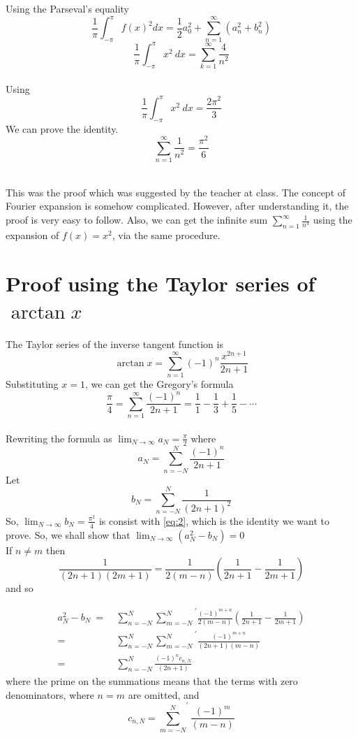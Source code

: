 Using the Parseval's equality
\[
    \frac{1}{\pi}\int_{-\pi}^{\pi}f(x)^2dx = \frac{1}{2}a_{0}^2+\sum_{n=1}^{\infty}(a_n^2+b_n^2)
\]
\[
    \frac{1}{\pi}\int_{-\pi}^{\pi}x^2~dx=\sum_{k=1}^\infty\frac{4}{n^2}
\]~\\


Using 
\[
    \frac{1}{\pi}\int_{-\pi}^{\pi}x^2~dx = \frac{2\pi^2}{3}
\]
We can prove the identity.
\[
    \sum_{n=1}^\infty\frac{1}{n^2}=\frac{\pi^2}{6}
\]~\\
\begin{remark}
    This was the proof which was suggested by the teacher at class. The concept of Fourier expansion is somehow complicated. However, after understanding it, the proof is very easy to follow. Also, we can get the infinite sum $\sum_{n=1}^\infty\frac{1}{n^4}$ using the expansion of $f(x)=x^2$, via the same procedure.
\end{remark}

\newpage
\section{Proof using the Taylor series of $\arctan x$~}
The Taylor series of the inverse tangent function is
\[
    \arctan x = \sum_{n=1}^\infty(-1)^n\frac{x^{2n+1}}{2n+1}
\]
Substituting $x = 1$, we can get the Gregory's formula
\[
    \frac{\pi}{4}=\sum_{n=1}^\infty\frac{(-1)^n}{2n+1} = \frac{1}{1} - \frac{1}{3} + \frac{1}{5} - \cdots
\]
~\\

Rewriting the formula as $\lim_{N\rightarrow\infty}a_N=\frac{\pi}{2}$ where
\[
    a_N = \sum_{n=-N}^{N}\frac{(-1)^n}{2n+1}
\]
Let
\[
    b_N = \sum_{n=-N}^{N}\frac{1}{(2n+1)^2}
\]
So, $\lim_{N\rightarrow\infty}b_N=\frac{\pi^2}{4}$ is consist with \eqref{eq:2}, which is the identity we want to prove. So, we shall show that $\lim_{N\rightarrow\infty}(a_N^2-b_N)=0$~\\

If $n \neq m$ then
\[
    \frac{1}{(2n+1)(2m+1)}=\frac{1}{2(m-n)}(\frac{1}{2n+1} - \frac{1}{2m+1})
\]
and so

\begin{equation}
\begin{split}
a_N^2-b_N~
={}& ~{\sum_{n=-N}^{N}\sum_{m=-N}^{N}}^\prime \frac{(-1)^{m+n}}{2(m-n)}(\frac{1}{2n+1} - \frac{1}{2m+1})\\
={}& ~{\sum_{n=-N}^{N}\sum_{m=-N}^{N}}^\prime \frac{(-1)^{m+n}}{(2n+1)(m-n)}\\
={}& ~\sum_{n=-N}^{N}\frac{(-1)^{n} c_{n,N}}{(2n+1)} \nonumber
\end{split}
\end{equation}
where the prime on the summations means that the terms with zero denominators, where $n=m$ are omitted, and
\[
    c_{n,N}={\sum_{m=-N}^{N}}^\prime \frac{(-1)^{m}}{(m-n)}
\]

